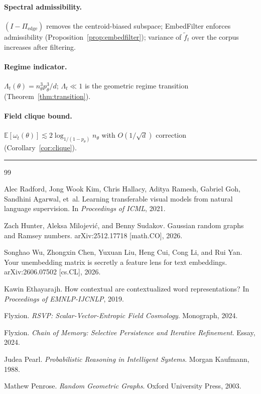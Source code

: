 \documentclass[12pt, a4paper]{article}
\theoremstyle{plain}
\theoremstyle{definition}
\begin{document}
\paragraph{Spectral admissibility.} $(I - \Pi_{\mathrm{edge}})$ removes the
centroid-biased subspace; EmbedFilter enforces admissibility
(Proposition~\ref{prop:embedfilter}); variance of $\tilde f_t$ over the corpus
increases after filtering.

\paragraph{Regime indicator.} $\Lambda_t(\theta) = n_\theta^3 p_\theta^3 / d$;
$\Lambda_t \ll 1$ is the geometric regime transition
(Theorem~\ref{thm:transition}).

\paragraph{Field clique bound.} $\mathbb{E}[\omega_t(\theta)] \lesssim
2 \log_{1/(1-p_\theta)} n_\theta$ with $O(1/\sqrt{d})$ correction
(Corollary~\ref{cor:clique}).

\bigskip
\noindent\rule{\textwidth}{0.4pt}

\begin{thebibliography}{99}

Alec Radford, Jong Wook Kim, Chris Hallacy, Aditya Ramesh, Gabriel Goh,
Sandhini Agarwal, et~al.
\newblock Learning transferable visual models from natural language supervision.
\newblock In \textit{Proceedings of ICML}, 2021.

Zach Hunter, Aleksa Milojević, and Benny Sudakov.
\newblock Gaussian random graphs and Ramsey numbers.
\newblock arXiv:2512.17718 [math.CO], 2026.

Songhao Wu, Zhongxin Chen, Yuxuan Liu, Heng Cui, Cong Li, and Rui Yan.
\newblock Your unembedding matrix is secretly a feature lens for text
  embeddings.
\newblock arXiv:2606.07502 [cs.CL], 2026.

Kawin Ethayarajh.
\newblock How contextual are contextualized word representations?
\newblock In \textit{Proceedings of EMNLP-IJCNLP}, 2019.

Flyxion.
\newblock \textit{RSVP: Scalar-Vector-Entropic Field Cosmology}.
\newblock Monograph, 2024.

Flyxion.
\newblock \textit{Chain of Memory: Selective Persistence and Iterative
  Refinement}.
\newblock Essay, 2024.

Judea Pearl.
\newblock \textit{Probabilistic Reasoning in Intelligent Systems}.
\newblock Morgan Kaufmann, 1988.

Mathew Penrose.
\newblock \textit{Random Geometric Graphs}.
\newblock Oxford University Press, 2003.

\end{thebibliography}
\end{document}
